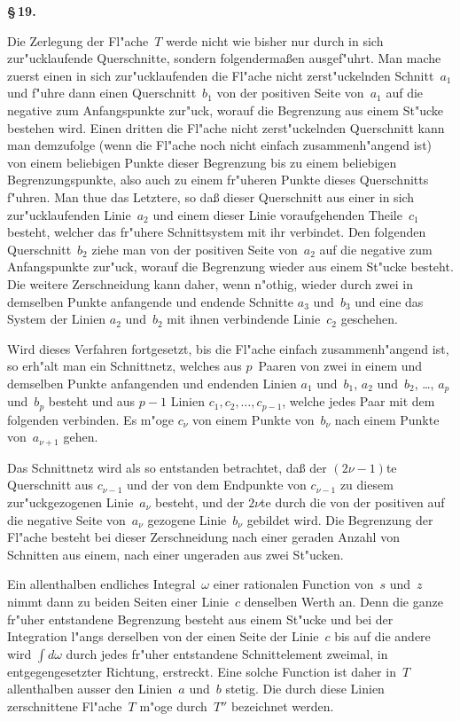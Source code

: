 \documentclass[12pt,a4paper]{article}
\begin{document}
\medskip
\textbf{\S\,19.}

Die Zerlegung der Fl"ache~$T$ werde nicht wie bisher nur durch in
sich zur"ucklaufende Querschnitte, sondern folgenderma\ss{}en ausgef"uhrt.
Man mache zuerst einen in sich zur"ucklaufenden die Fl"ache nicht
zerst"uckelnden Schnitt~$a_1$ und f"uhre dann einen Querschnitt~$b_1$ von der
positiven Seite von~$a_1$ auf die negative zum Anfangspunkte zur"uck,
worauf die Begrenzung aus einem St"ucke bestehen wird. Einen dritten
die Fl"ache nicht zerst"uckelnden Querschnitt kann man demzufolge (wenn
die Fl"ache noch nicht einfach zusammenh"angend ist) von einem beliebigen
Punkte dieser Begrenzung bis zu einem beliebigen Begrenzungspunkte,
also auch zu einem fr"uheren Punkte dieses Querschnitts f"uhren. Man
thue das Letztere, so da\ss{} dieser Querschnitt aus einer in sich
zur"ucklaufenden Linie~$a_2$ und einem dieser Linie voraufgehenden Theile~$c_1$
besteht, welcher das fr"uhere Schnittsystem mit ihr verbindet. Den
folgenden Querschnitt~$b_2$ ziehe man von der positiven Seite von~$a_2$ auf
die negative zum Anfangspunkte zur"uck, worauf die Begrenzung wieder
aus einem St"ucke besteht. Die weitere Zerschneidung kann daher, wenn
n"othig, wieder durch zwei in demselben Punkte anfangende und endende
Schnitte $a_3$ und~$b_3$ und eine das System der Linien $a_2$ und~$b_2$ mit
ihnen verbindende Linie~$c_2$ geschehen.

Wird dieses Verfahren fortgesetzt, bis die Fl"ache einfach zusammenh"angend
ist, so erh"alt man ein Schnittnetz, welches aus $p$~Paaren von zwei in
einem und demselben Punkte anfangenden und endenden Linien
$a_1$ und~$b_1$, $a_2$ und~$b_2$, \ldots, $a_p$ und~$b_p$ besteht und aus $p - 1$
Linien $c_1, c_2, \ldots, c_{p-1}$, welche jedes Paar mit dem folgenden verbinden.
Es m"oge $c_\nu$ von einem Punkte von~$b_\nu$ nach einem Punkte von~$a_{\nu+1}$
gehen.

Das Schnittnetz wird als so entstanden betrachtet, da\ss{} der
$(2\nu - 1)$te Querschnitt aus $c_{\nu-1}$ und der von dem Endpunkte von
$c_{\nu-1}$ zu diesem zur"uckgezogenen Linie~$a_\nu$ besteht, und der $2\nu$te
durch die von der positiven auf die negative Seite von~$a_\nu$ gezogene
Linie~$b_\nu$ gebildet wird. Die Begrenzung der Fl"ache besteht bei dieser
Zerschneidung nach einer geraden Anzahl von Schnitten aus einem, nach
einer ungeraden aus zwei St"ucken.

Ein allenthalben endliches Integral~$\omega$ einer rationalen Function von~$s$
und~$z$ nimmt dann zu beiden Seiten einer Linie~$c$ denselben Werth an.
Denn die ganze fr"uher entstandene Begrenzung besteht aus einem St"ucke
und bei der Integration l"angs derselben von der einen Seite der Linie~$c$
bis auf die andere wird $\int d\omega$ durch jedes fr"uher entstandene
Schnittelement zweimal, in entgegengesetzter Richtung, erstreckt.
Eine solche Function ist daher in~$T$ allenthalben ausser den Linien~$a$
und~$b$ stetig. Die durch diese Linien zerschnittene Fl"ache~$T$ m"oge
durch~$T''$ bezeichnet werden.
\end{document}
